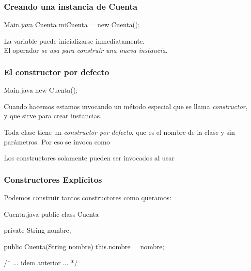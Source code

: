 \documentclass{beamer}
\begin{document}
\begin{frame}[fragile]
  \frametitle{Creando una instancia de Cuenta}

  \begin{java}{Main.java}
    Cuenta miCuenta = new Cuenta();
  \end{java}

  \begin{exampleblock}{}
    La variable puede inicializarse inmediatamente.\\
    El operador  \emph{se usa para construir una nueva
      instancia}.
  \end{exampleblock}
  
\end{frame}

\begin{frame}[fragile]
  \frametitle{El constructor por defecto}

  \begin{java}{Main.java}
    new Cuenta();
  \end{java}

  \begin{exampleblock}{}
    Cuando hacemos  estamos invocando un método
    especial que se llama \emph{constructor}, y que sirve para crear
    instancias.
  \end{exampleblock}

  \begin{exampleblock}{}
    Toda clase tiene un \emph{constructor por defecto}, que es el
    nombre de la clase y sin parámetros. Por eso se invoca como
  \end{exampleblock}

  \begin{exampleblock}{}
    Los constructores solamente pueden ser invocados al usar
  \end{exampleblock}
  
\end{frame}

\begin{frame}[fragile]
  \frametitle{Constructores Explícitos}

  Podemos construir tantos constructores como queramos:
  \begin{java}{Cuenta.java}
    public class Cuenta {
      private String nombre;

      public Cuenta(String nombre) {
        this.nombre = nombre;
      }

      /* ... idem anterior ... */
    }
    
  \end{java}
  
\end{frame}
\end{document}
